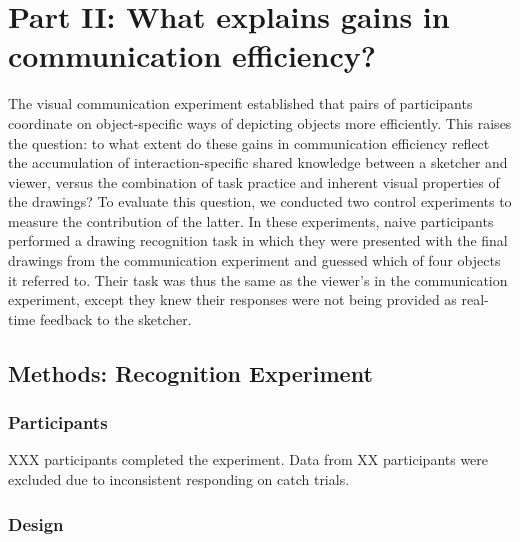 \documentclass[10pt,letterpaper]{article}
\begin{document}

\section{Part II: What explains gains in communication efficiency?}

The visual communication experiment established that pairs of participants coordinate on object-specific ways of depicting objects more efficiently. 
This raises the question: to what extent do these gains in communication efficiency reflect the accumulation of interaction-specific shared knowledge between a sketcher and viewer, versus the combination of task practice and inherent visual properties of the drawings? 
To evaluate this question, we conducted two control experiments to measure the contribution of the latter. 
In these experiments, naive participants performed a drawing recognition task in which they were presented with the final drawings from the communication experiment and guessed which of four objects it referred to. 
Their task was thus the same as the viewer's in the communication experiment, except they knew their responses were not being provided as real-time feedback to the sketcher.


\subsection{Methods: Recognition Experiment}

\subsubsection{Participants}

XXX participants completed the experiment. Data from XX participants were excluded due to inconsistent responding on catch trials.  

\subsubsection{Design}
\end{document}
